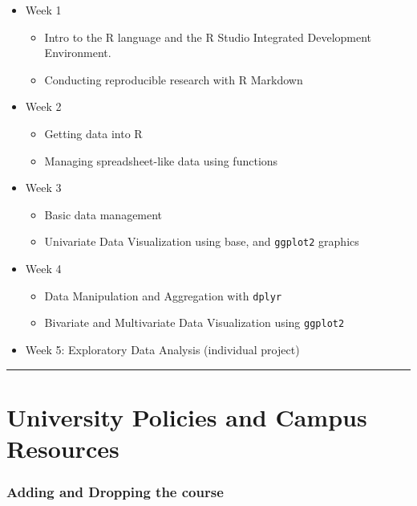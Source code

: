\documentclass[11pt,]{article}
\providecommand{\tightlist}{%
  \setlength{\itemsep}{0pt}\setlength{\parskip}{0pt}}
\begin{document}
\begin{itemize}
\tightlist
\item
  Week 1

  \begin{itemize}
  \tightlist
  \item
    Intro to the R language and the R Studio Integrated Development
    Environment.
  \item
    Conducting reproducible research with R Markdown
  \end{itemize}
\item
  Week 2

  \begin{itemize}
  \tightlist
  \item
    Getting data into R
  \item
    Managing spreadsheet-like data using functions
  \end{itemize}
\item
  Week 3

  \begin{itemize}
  \tightlist
  \item
    Basic data management
  \item
    Univariate Data Visualization using base, and \texttt{ggplot2}
    graphics
  \end{itemize}
\item
  Week 4

  \begin{itemize}
  \tightlist
  \item
    Data Manipulation and Aggregation with \texttt{dplyr}
  \item
    Bivariate and Multivariate Data Visualization using \texttt{ggplot2}
  \end{itemize}
\item
  Week 5: Exploratory Data Analysis (individual project)
\end{itemize}

\begin{center}\rule{0.5\linewidth}{\linethickness}\end{center}

\hypertarget{university-policies-and-campus-resources}{%
\section{University Policies and Campus
Resources}\label{university-policies-and-campus-resources}}

\hypertarget{adding-and-dropping-the-course}{%
\subsubsection{Adding and Dropping the
course}\label{adding-and-dropping-the-course}}
\end{document}
